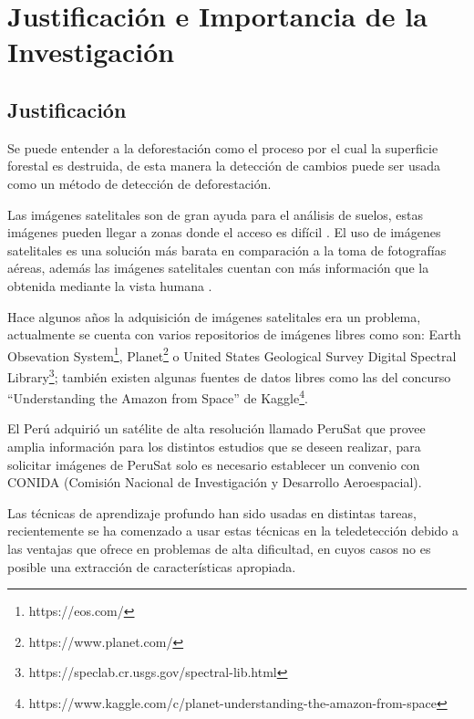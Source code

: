 \section{Justificación e Importancia de la Investigación}
\subsection{Justificación}
Se puede entender a la deforestación como el proceso por el cual la superficie forestal es destruida, de esta manera la detección de cambios puede ser usada como un método de detección de deforestación.   



Las imágenes satelitales son de gran ayuda para el análisis de suelos, estas imágenes pueden llegar a zonas donde el acceso es difícil \cite{AlenCastro2015}. El uso de imágenes satelitales es una solución más barata en comparación a la toma de fotografías aéreas, además las imágenes satelitales cuentan con más información que la obtenida mediante la vista humana \cite{unsalan2013multispectral}.


Hace algunos años la adquisición de imágenes satelitales era un problema, actualmente se cuenta con varios repositorios de imágenes libres como son: Earth Obsevation System\footnote{https://eos.com/}, Planet\footnote{https://www.planet.com/} o United States Geological Survey Digital Spectral Library\footnote{https://speclab.cr.usgs.gov/spectral-lib.html}; también existen algunas fuentes de datos libres como las del concurso ``Understanding the Amazon from Space'' de Kaggle\footnote{https://www.kaggle.com/c/planet-understanding-the-amazon-from-space}. 


El Perú adquirió un satélite de alta resolución llamado PeruSat que provee amplia información para los distintos estudios que se deseen realizar, para solicitar imágenes de PeruSat solo es necesario establecer un convenio con CONIDA (Comisión Nacional de Investigación y Desarrollo Aeroespacial).

Las técnicas de aprendizaje profundo han sido usadas en distintas tareas, recientemente se ha comenzado a usar estas técnicas en la teledetección \cite{zhang2016deep} debido a las ventajas que ofrece en problemas de alta dificultad, en cuyos casos no es posible una extracción de características apropiada.

